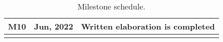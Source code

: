\begin{longtable}{|l|l|m{9cm}|}
		M10                & Jun, 2022       & Written elaboration is completed                                                                                                                                                                                                                                                                                                                                                                                                                                                    \\ \hline
		\caption{Milestone schedule.}\label{tab:mileston_schedule}
	\end{longtable}
